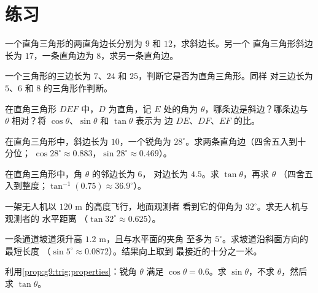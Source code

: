 \section{练习}

\begin{exercise}[$\star$]\label{exo:g9:trig:1}
一个直角三角形的两直角边长分别为 $9$ 和 $12$，求斜边长。另一个
直角三角形斜边长为 $17$，一条直角边为 $8$，求另一条直角边。
\end{exercise}

\begin{exercise}[$\star$]\label{exo:g9:trig:2}
一个三角形的三边长为 $7$、$24$ 和 $25$，判断它是否为直角三角形。同样
对三边长为 $5$、$6$ 和 $8$ 的三角形作判断。
\end{exercise}

\begin{exercise}[$\star$]\label{exo:g9:trig:3}
在直角三角形 $DEF$ 中，$D$ 为直角，记 $E$ 处的角为
$\theta$，哪条边是斜边？哪条边与
$\theta$ 相对？将 $\cos\theta$、$\sin\theta$ 和 $\tan\theta$ 表示为
边 $DE$、$DF$、$EF$ 的比。
\end{exercise}

\begin{exercise}[$\star$]\label{exo:g9:trig:4}
在直角三角形中，斜边长为 $10$，一个锐角为
$28^\circ$。求两条直角边（四舍五入到十分位；
$\cos 28^\circ \approx 0.883$，$\sin 28^\circ \approx 0.469$）。
\end{exercise}

\begin{exercise}[$\star$]\label{exo:g9:trig:5}
在直角三角形中，角 $\theta$ 的邻边长为 $6$，
对边长为 $4.5$。求 $\tan\theta$，再求 $\theta$
（四舍五入到整度；$\tan^{-1}(0.75) \approx 36.9^\circ$）。
\end{exercise}

\begin{exercise}[$\star\star$]\label{exo:g9:trig:6}
一架无人机以 $120$ m 的高度飞行，地面观测者
看到它的仰角为 $32^\circ$。求无人机与观测者的
水平距离
（$\tan 32^\circ \approx 0.625$）。
\end{exercise}

\begin{exercise}[$\star\star$]\label{exo:g9:trig:7}
一条通道坡道须升高 $1.2$ m，且与水平面的夹角
至多为 $5^\circ$。求坡道沿斜面方向的最短长度
（$\sin 5^\circ \approx 0.0872$）。结果向上取到
最接近的十分之一米。
\end{exercise}

\begin{exercise}[$\star\star$]\label{exo:g9:trig:8}
利用\cref{prop:g9:trig:properties}：锐角 $\theta$ 满足
$\cos\theta = 0.6$。求 $\sin\theta$，不求 $\theta$，然后
求 $\tan\theta$。
\end{exercise}

